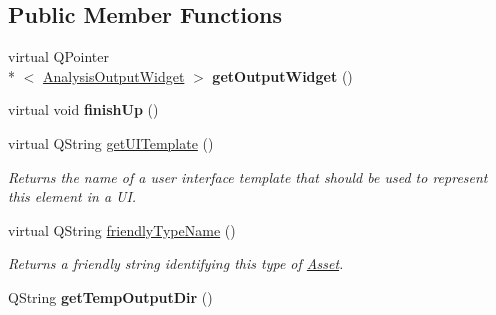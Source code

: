 \subsection*{Public Member Functions}
\begin{DoxyCompactItemize}
\item 
\hypertarget{class_picto_1_1_analysis_output_dep_af589580a41934af93afeee53d46af672}{virtual Q\-Pointer\\*
$<$ \hyperlink{class_picto_1_1_analysis_output_widget}{Analysis\-Output\-Widget} $>$ {\bfseries get\-Output\-Widget} ()}\label{class_picto_1_1_analysis_output_dep_af589580a41934af93afeee53d46af672}

\item 
\hypertarget{class_picto_1_1_analysis_output_dep_a5497bc4563eae59f475993239d91e064}{virtual void {\bfseries finish\-Up} ()}\label{class_picto_1_1_analysis_output_dep_a5497bc4563eae59f475993239d91e064}

\item 
\hypertarget{class_picto_1_1_analysis_output_dep_a7418cc3011ca4d1a5d55d9b8ac426b69}{virtual Q\-String \hyperlink{class_picto_1_1_analysis_output_dep_a7418cc3011ca4d1a5d55d9b8ac426b69}{get\-U\-I\-Template} ()}\label{class_picto_1_1_analysis_output_dep_a7418cc3011ca4d1a5d55d9b8ac426b69}

\begin{DoxyCompactList}\small\item\em Returns the name of a user interface template that should be used to represent this element in a U\-I. \end{DoxyCompactList}\item 
virtual Q\-String \hyperlink{class_picto_1_1_analysis_output_dep_a145e2372726de801147b3ee2b9517621}{friendly\-Type\-Name} ()
\begin{DoxyCompactList}\small\item\em Returns a friendly string identifying this type of \hyperlink{class_picto_1_1_asset}{Asset}. \end{DoxyCompactList}\item 
\hypertarget{class_picto_1_1_analysis_output_dep_a29fa7fc1915fcd04426da4606bb9861f}{Q\-String {\bfseries get\-Temp\-Output\-Dir} ()}\label{class_picto_1_1_analysis_output_dep_a29fa7fc1915fcd04426da4606bb9861f}

\end{DoxyCompactItemize}
